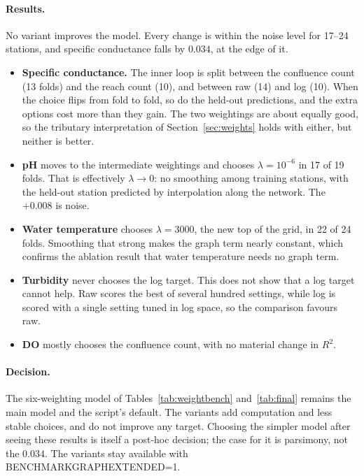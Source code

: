 \documentclass[11pt]{article}
\newcommand{\codeus}{\textunderscore\allowbreak}
\newcommand{\code}[1]{{\ttfamily\let\_\codeus #1}}
\begin{document}
\paragraph{Results.} No variant improves the model. Every change is within the noise level for 17--24
stations, and specific conductance falls by $0.034$, at the edge of it.
\begin{itemize}
  \item \textbf{Specific conductance.} The inner loop is split between the confluence count (13
        folds) and the reach count (10), and between raw (14) and log (10). When the choice flips
        from fold to fold, so do the held-out predictions, and the extra options cost more than they
        gain. The two weightings are about equally good, so the tributary interpretation of
        Section~\ref{sec:weights} holds with either, but neither is better.
  \item \textbf{pH} moves to the intermediate weightings and chooses $\lambda=10^{-6}$ in 17 of 19
        folds. That is effectively $\lambda\to0$: no smoothing among training stations, with the
        held-out station predicted by interpolation along the network. The $+0.008$ is noise.
  \item \textbf{Water temperature} chooses $\lambda=3000$, the new top of the grid, in 22 of 24 folds.
        Smoothing that strong makes the graph term nearly constant, which confirms the ablation
        result that water temperature needs no graph term.
  \item \textbf{Turbidity} never chooses the log target. This does not show that a log target cannot
        help. Raw scores the best of several hundred settings, while log is scored with a single
        setting tuned in log space, so the comparison favours raw.
  \item \textbf{DO} mostly chooses the confluence count, with no material change in $R^2$.
\end{itemize}

\paragraph{Decision.} The six-weighting model of Tables~\ref{tab:weightbench} and~\ref{tab:final}
remains the main model and the script's default. The variants add computation and less stable
choices, and do not improve any target. Choosing the simpler model after seeing these results is
itself a post-hoc decision; the case for it is parsimony, not the $0.034$. The variants stay available
with \code{BENCHMARK\_GRAPH\_EXTENDED=1}.
\end{document}
